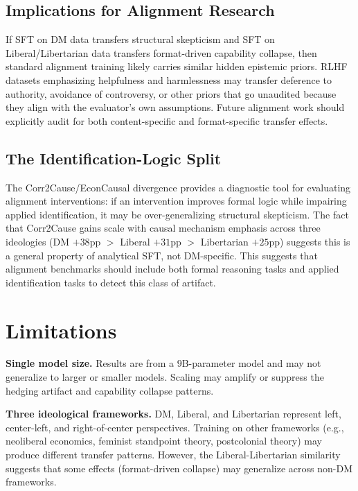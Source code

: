 \documentclass[11pt]{article}
\begin{document}
\subsection{Implications for Alignment Research}

If SFT on DM data transfers structural skepticism and SFT on Liberal/Libertarian data transfers format-driven capability collapse, then standard alignment training likely carries similar hidden epistemic priors. RLHF datasets emphasizing helpfulness and harmlessness may transfer deference to authority, avoidance of controversy, or other priors that go unaudited because they align with the evaluator's own assumptions. Future alignment work should explicitly audit for both content-specific and format-specific transfer effects.

\subsection{The Identification-Logic Split}

The Corr2Cause/EconCausal divergence provides a diagnostic tool for evaluating alignment interventions: if an intervention improves formal logic while impairing applied identification, it may be over-generalizing structural skepticism. The fact that Corr2Cause gains scale with causal mechanism emphasis across three ideologies (DM $+38$pp $>$ Liberal $+31$pp $>$ Libertarian $+25$pp) suggests this is a general property of analytical SFT, not DM-specific. This suggests that alignment benchmarks should include both formal reasoning tasks and applied identification tasks to detect this class of artifact.

\section{Limitations}

\textbf{Single model size.} Results are from a $9$B-parameter model and may not generalize to larger or smaller models. Scaling may amplify or suppress the hedging artifact and capability collapse patterns.

\textbf{Three ideological frameworks.} DM, Liberal, and Libertarian represent left, center-left, and right-of-center perspectives. Training on other frameworks (e.g., neoliberal economics, feminist standpoint theory, postcolonial theory) may produce different transfer patterns. However, the Liberal-Libertarian similarity suggests that some effects (format-driven collapse) may generalize across non-DM frameworks.
\end{document}
